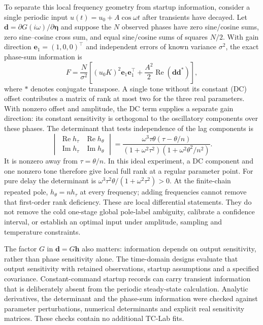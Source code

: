 \documentclass[11pt]{article}
\begin{document}
To separate this local frequency geometry from startup information, consider
a single periodic input $u(t)=u_0+A\cos\omega t$ after transients have decayed.
Let $\bm d=\partial G(i\omega)/\partial\bm\eta$ and suppose the $N$ observed
phases have zero sine/cosine sums, zero sine--cosine cross sum, and equal
sine/cosine sums of squares $N/2$.
With gain direction $\bm e_1=(1,0,0)^\top$ and independent errors of known
variance $\sigma^2$, the exact phase-sum information is
\begin{equation}
 F=\frac{N}{\sigma^2}\left[
 (u_0K)^2\bm e_1\bm e_1^\top+
 \frac{A^2}{2}\operatorname{Re}(\bm d\bm d^{*})\right],
 \label{eq:periodic-information}
\end{equation}
where $*$ denotes conjugate transpose. A single tone without its constant (DC) offset
contributes a matrix of rank at most two for the three real parameters.
With nonzero offset and amplitude, the DC term supplies a separate gain direction:
its constant sensitivity is orthogonal to the oscillatory components over these
phases. The determinant that tests independence of the lag
components is
\begin{equation}
 \begin{vmatrix}
 \operatorname{Re}h_\tau&\operatorname{Re}h_\theta\\
 \operatorname{Im}h_\tau&\operatorname{Im}h_\theta
 \end{vmatrix}
 =\frac{\omega^3\tau\theta(\tau-\theta/n)}
 {(1+\omega^2\tau^2)(1+\omega^2\theta^2/n^2)}.
 \label{eq:frequency-lag-area}
\end{equation}
It is nonzero away from $\tau=\theta/n$. In this ideal experiment, a DC
component and one nonzero tone therefore give local full rank at a regular
parameter point. For pure delay the determinant is
$\omega^3\tau^2\theta/(1+\omega^2\tau^2)>0$.
At the finite-chain repeated pole, $h_\theta=nh_\tau$ at every frequency;
adding frequencies cannot remove that first-order rank deficiency.
These are local differential statements. They do not remove the cold one-stage
global pole-label ambiguity, calibrate a confidence interval, or establish an
optimal input under amplitude, sampling and temperature constraints.

The factor $G$ in $\bm d=G\bm h$ also matters: information depends on output
sensitivity, rather than phase sensitivity alone. The time-domain designs
evaluate that output sensitivity with retained observations, startup assumptions
and a specified covariance. Constant-command startup records can carry transient
information that is deliberately absent from the periodic steady-state calculation.
Analytic derivatives, the determinant and the phase-sum information were checked
against parameter perturbations, numerical determinants and explicit real
sensitivity matrices. These checks contain no additional TC-Lab fits.
\end{document}
